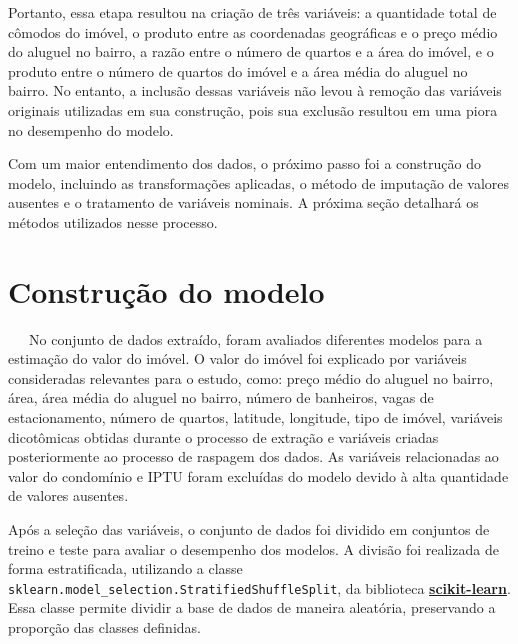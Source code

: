 \documentclass[
  12pt,
  a4paper,
]{scrreprt}
\begin{document}
\vspace{12pt}

Portanto, essa etapa resultou na criação de três variáveis: a quantidade
total de cômodos do imóvel, o produto entre as coordenadas geográficas e
o preço médio do aluguel no bairro, a razão entre o número de quartos e
a área do imóvel, e o produto entre o número de quartos do imóvel e a
área média do aluguel no bairro. No entanto, a inclusão dessas variáveis
não levou à remoção das variáveis originais utilizadas em sua
construção, pois sua exclusão resultou em uma piora no desempenho do
modelo.

\vspace{12pt}

Com um maior entendimento dos dados, o próximo passo foi a construção do
modelo, incluindo as transformações aplicadas, o método de imputação de
valores ausentes e o tratamento de variáveis nominais. A próxima seção
detalhará os métodos utilizados nesse processo.

\section{Construção do modelo}\label{construuxe7uxe3o-do-modelo}

~~~No conjunto de dados extraído, foram avaliados diferentes modelos
para a estimação do valor do imóvel. O valor do imóvel foi explicado por
variáveis consideradas relevantes para o estudo, como: preço médio do
aluguel no bairro, área, área média do aluguel no bairro, número de
banheiros, vagas de estacionamento, número de quartos, latitude,
longitude, tipo de imóvel, variáveis dicotômicas obtidas durante o
processo de extração e variáveis criadas posteriormente ao processo de
raspagem dos dados. As variáveis relacionadas ao valor do condomínio e
IPTU foram excluídas do modelo devido à alta quantidade de valores
ausentes.

\vspace{12pt}

Após a seleção das variáveis, o conjunto de dados foi dividido em
conjuntos de treino e teste para avaliar o desempenho dos modelos. A
divisão foi realizada de forma estratificada, utilizando a classe
\texttt{sklearn.model\_selection.StratifiedShuffleSplit}, da biblioteca
\href{https://scikit-learn.org/stable/}{\textbf{scikit-learn}}. Essa
classe permite dividir a base de dados de maneira aleatória, preservando
a proporção das classes definidas.

\vspace{12pt}
\end{document}
